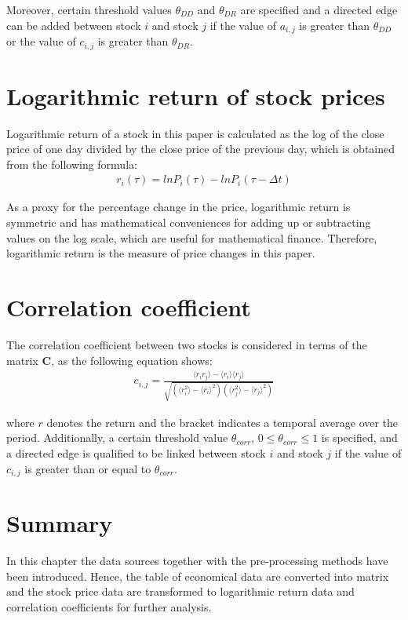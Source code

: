 Moreover, certain threshold values $\theta_{DD}$ and $\theta_{DR}$ are specified and a directed edge can be added between stock $i$ and stock $j$ if the value of $a_{i,j}$ is greater than $\theta_{DD}$ or the value of $c_{i,j}$ is greater than $\theta_{DR}$.

\section{Logarithmic return of stock prices}
Logarithmic return of a stock in this paper is calculated as the log of the close price of one day divided by the close price of the previous day, which is obtained from the following formula:
\begin{eqnarray}\label{equ:log}
r_i(\tau)=lnP_i(\tau)-lnP_i(\tau-\Delta t)
\end{eqnarray}

As a proxy for the percentage change in the price, logarithmic return is symmetric and has mathematical conveniences for adding up or subtracting values on the log scale, which are useful for mathematical finance. Therefore, logarithmic return is the measure of price changes in this paper.

\section{Correlation coefficient}
The correlation coefficient between two stocks is considered in terms of the matrix \textbf{C}, as the following equation shows:
\begin{eqnarray}\label{equ:corr}
c_{i,j}=\frac{\langle r_ir_j \rangle-\langle r_i\rangle \langle r_j\rangle}{\sqrt{(\langle r_i^2\rangle-\langle r_i\rangle^2)(\langle r_j^2\rangle-\langle r_j\rangle^2)}}
\end{eqnarray}

where $r$ denotes the return and the bracket indicates a temporal average over the period. Additionally, a certain threshold value $\theta_{corr}$, $0\leq \theta_{corr} \leq1$ is specified, and a directed edge is qualified to be linked between stock $i$ and stock $j$ if the value of $c_{i,j}$ is greater than or equal to $\theta_{corr}$.

\section{Summary}
In this chapter the data sources together with the pre-processing methods have been introduced. Hence, the table of economical data are converted into matrix and the stock price data are transformed to logarithmic return data and correlation coefficients for further analysis.